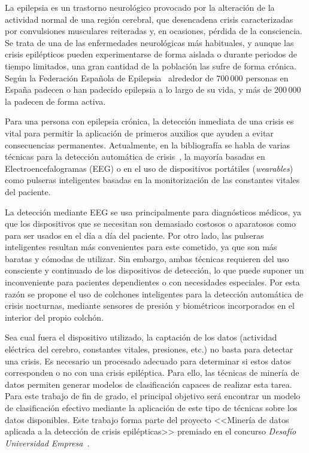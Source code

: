 
La epilepsia es un trastorno neurológico provocado por la alteración de la actividad normal de una región cerebral, que desencadena crisis caracterizadas por convulsiones musculares reiteradas y, en ocasiones, pérdida de la consciencia. Se trata de una de las enfermedades neurológicas más habituales, y aunque las crisis epilépticos pueden experimentarse de forma aislada o durante periodos de tiempo limitados, una gran cantidad de la población las sufre de forma crónica. Según la Federación Española de Epilepsia~\cite{fed_esp_epilepsia} alrededor de 700\,000 personas en España padecen o han padecido epilepsia a lo largo de su vida, y más de 200\,000 la padecen de forma activa. 

Para una persona con epilepsia crónica, la detección inmediata de una crisis es vital para permitir la aplicación de primeros auxilios que ayuden a evitar consecuencias permanentes. Actualmente, en la bibliografía se habla de varias técnicas para la detección automática de crisis~\cite{ramgopal2014epilepsy,tzallas2012automated}, la mayoría basadas en Electroencefalogramas (EEG) o en el uso de dispositivos portátiles (\textit{wearables}) como pulseras inteligentes basadas en la monitorización de las constantes vitales del paciente. 

La detección mediante EEG se usa principalmente para diagnósticos médicos, ya que los dispositivos que se necesitan son demasiado costosos o aparatosos como para ser usados en el día a día del paciente. Por otro lado, las pulseras inteligentes resultan más convenientes para este cometido, ya que son más baratas y cómodas de utilizar. Sin embargo, ambas técnicas requieren del uso consciente y continuado de los dispositivos de detección, lo que puede suponer un inconveniente para pacientes dependientes o con necesidades especiales. Por esta razón se propone el uso de colchones inteligentes para la detección automática de crisis nocturnas, mediante sensores de presión y biométricos incorporados en el interior del propio colchón. 

Sea cual fuera el dispositivo utilizado, la captación de los datos (actividad eléctrica del cerebro, constantes vitales, presiones, etc.) no basta para detectar una crisis. Es necesario un procesado adecuado para determinar si estos datos corresponden o no con una crisis epiléptica. Para ello, las técnicas de minería de datos permiten generar modelos de clasificación capaces de realizar esta tarea. Para este trabajo de fin de grado, el principal objetivo será encontrar un modelo de clasificación efectivo mediante la aplicación de este tipo de técnicas sobre los datos disponibles. Este trabajo forma parte del proyecto <<Minería de datos aplicada a la detección de crisis epilépticas>> premiado en el concurso \textit{Desafío Universidad Empresa}~\cite{desafiouniversidadempresa}. 

